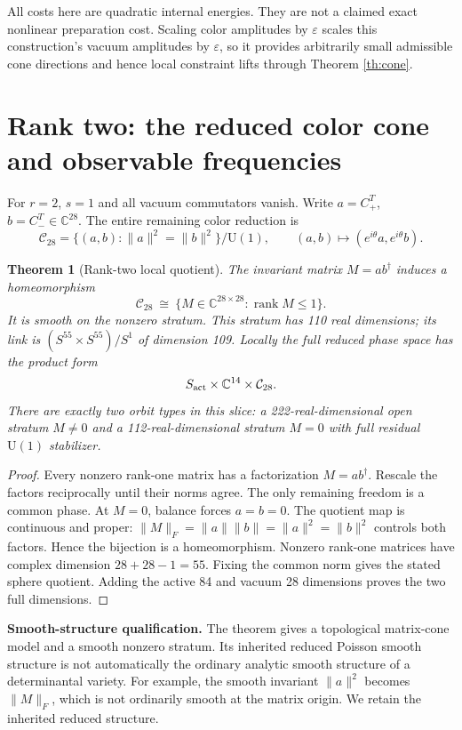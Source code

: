 \documentclass[11pt,a4paper]{article}
\newtheorem{theorem}{Theorem}\newtheorem{lemma}[theorem]{Lemma}\newtheorem{proposition}[theorem]{Proposition}
\begin{document}
All costs here are quadratic internal energies. They are not a claimed exact nonlinear preparation cost. Scaling color amplitudes by $\varepsilon$ scales this construction's vacuum amplitudes by $\varepsilon$, so it provides arbitrarily small admissible cone directions and hence local constraint lifts through Theorem \ref{th:cone}.

\newpage
\section{Rank two: the reduced color cone and observable frequencies}
For $r=2$, $s=1$ and all vacuum commutators vanish. Write $a=C_+^T$, $b=C_-^T\in\mathbb C^{28}$. The entire remaining color reduction is
\[
\mathcal C_{28}=\{(a,b):\|a\|^2=\|b\|^2\}/\mathrm U(1),
\qquad (a,b)\mapsto(e^{i\theta}a,e^{i\theta}b).
\]
\begin{theorem}[Rank-two local quotient]\label{th:r2}
The invariant matrix $M=ab^\dagger$ induces a homeomorphism
\[
\mathcal C_{28}\ \cong\ \{M\in\mathbb C^{28\times28}:\operatorname{rank}M\le1\}.
\]
It is smooth on the nonzero stratum. This stratum has 110 real dimensions; its link is $(S^{55}\times S^{55})/S^1$ of dimension 109. Locally the full reduced phase space has the product form
\[
S_{\rm act}\times\mathbb C^{14}\times\mathcal C_{28}.
\]
There are exactly two orbit types in this slice: a 222-real-dimensional open stratum $M\ne0$ and a 112-real-dimensional stratum $M=0$ with full residual $\mathrm U(1)$ stabilizer.
\end{theorem}
\begin{proof}
Every nonzero rank-one matrix has a factorization $M=ab^\dagger$. Rescale the factors reciprocally until their norms agree. The only remaining freedom is a common phase. At $M=0$, balance forces $a=b=0$. The quotient map is continuous and proper: $\|M\|_F=\|a\|\|b\|=\|a\|^2=\|b\|^2$ controls both factors. Hence the bijection is a homeomorphism. Nonzero rank-one matrices have complex dimension $28+28-1=55$. Fixing the common norm gives the stated sphere quotient. Adding the active 84 and vacuum 28 dimensions proves the two full dimensions.
\end{proof}
\textbf{Smooth-structure qualification.} The theorem gives a topological matrix-cone model and a smooth nonzero stratum. Its inherited reduced Poisson smooth structure is not automatically the ordinary analytic smooth structure of a determinantal variety. For example, the smooth invariant $\|a\|^2$ becomes $\|M\|_F$, which is not ordinarily smooth at the matrix origin. We retain the inherited reduced structure.
\end{document}
